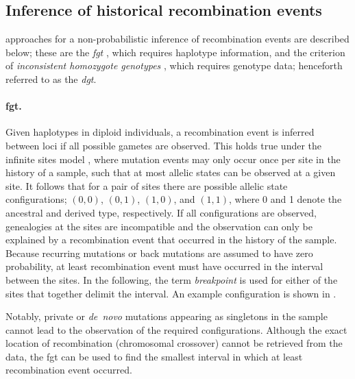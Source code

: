 %
\subsection{Inference of historical recombination events}
%

 approaches for a non-probabilistic inference of recombination events are described below; these are the \emph{\acrlong{fgt}} \citep{Hudson:1985wh}, which requires haplotype information, and the criterion of \emph{inconsistent homozygote genotypes} \citep[see][]{Mathieson:2014ig}, which requires genotype data; henceforth referred to as the \emph{\acrlong{dgt}}.



\paragraph{\Gls{fgt}.}
Given  haplotypes in  diploid individuals, a recombination event is inferred between  loci if all  possible gametes are observed.
This holds true under the infinite sites model \citep{Kimura:1969tn}, where mutation events may only occur once per site in the history of a sample, such that at most  allelic states can be observed at a given site.
It follows that for a pair of sites there are  possible allelic state configurations; ${(0,0)}$, ${(0,1)}$, ${(1,0)}$, and ${(1,1)}$, where 0 and 1 denote the ancestral and derived type, respectively.
If all  configurations are observed, genealogies at the  sites are incompatible and the observation can only be explained by a recombination event that occurred in the history of the sample.
Because recurring mutations or back mutations are assumed to have zero probability, at least  recombination event must have occurred in the interval between the  sites.
In the following, the term \emph{breakpoint} is used for either of the  sites that together delimit the interval.
An example configuration is shown in .

%

%

Notably, private or \emph{de~novo} mutations appearing as singletons in the sample cannot lead to the observation of the  required configurations.
Although the exact location of recombination (\ie chromosomal crossover) cannot be retrieved from the data, the \gls{fgt} can be used to find the smallest interval in which at least  recombination event occurred.



